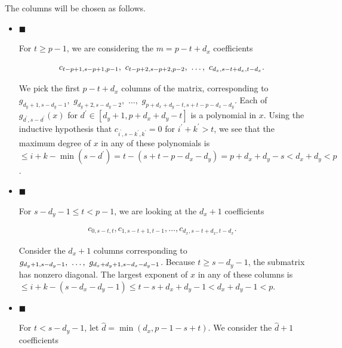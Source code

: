 The columns will be chosen as follows.\par


\begin{itemize}


\item[] 
$\blacksquare$ 


For $t\geq p-1$, we are considering the $m=p-t+d_{x}$ coefficients\par


\[\begin{gathered}
c_{t-p+1,s-p+1,p-1},\nobreak\ c_{t-p+2,s-p+2,p-2},\nobreak\ \dots,\nobreak\ c_{d_{x},s-t+d_{x},t-d_{x}}.
\end{gathered}\]


We pick the first $p-t+d_{x}$ columns of the matrix, corresponding to $g_{d_{y}+1,s-d_{y}-1},$ $g_{d_{y}+2,s-d_{y}-2},$ $\dots,$ $g_{p+d_{x}+d_{y}-t,s+t-p-d_{x}-d_{y}}$. Each of $g_{d^{\prime},s-d^{\prime}}(x)$ for $d^{\prime}\in[d_{y}+1,p+d_{x}+d_{y}-t]$ is a polynomial in $x$. Using the inductive hypothesis that $c_{i^{\prime},s-k^{\prime},k^{\prime}}=0$ for $i^{\prime}+k^{\prime}>t$, we see that the maximum degree of $x$ in any of these polynomials is $\leq i+k-\min(s-d^{\prime})=t-(s+t-p-d_{x}-d_{y})=p+d_{x}+d_{y}-s<d_{x}+d_{y}<p$.\par





\item[] 
$\blacksquare$ 


For $s-d_{y}-1\leq t<p-1$, we are looking at the $d_{x}+1$ coefficients\par


\[\begin{gathered}
c_{0,s-t,t},c_{1,s-t+1,t-1},\dots,c_{d_{x},s-t+d_{x},t-d_{x}}.
\end{gathered}\]


Consider the $d_{x}+1$ columns corresponding to $g_{d_{y}+1,s-d_{y}-1},\nobreak\ \dots,\nobreak\ g_{d_{x}+d_{y}+1,s-d_{x}-d_{y}-1}$. Because $t\geq s-d_{y}-1$, the submatrix has nonzero diagonal. The largest exponent of $x$ in any of these columns is $\leq i+k-(s-d_{x}-d_{y}-1)\leq t-s+d_{x}+d_{y}-1<d_{x}+d_{y}-1<p$.\par





\item[] 
$\blacksquare$ 


For $t<s-d_{y}-1$, let $\hat{d}=\min(d_{x},p-1-s+t)$. We consider the $\hat{d}+1$ coefficients\par



\end{itemize}
